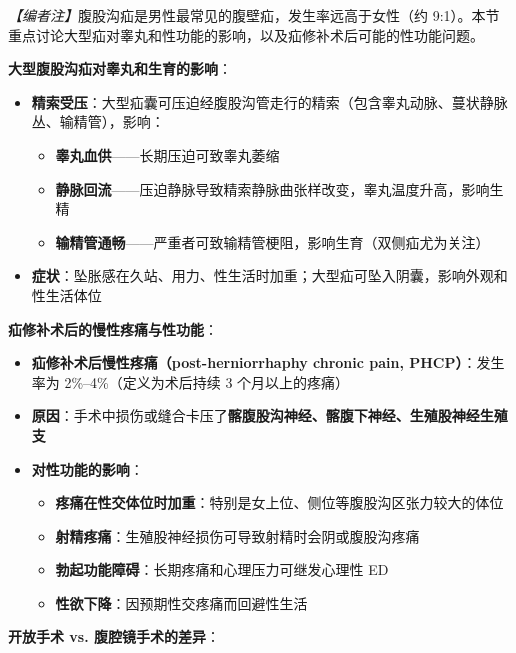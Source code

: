 \documentclass[12pt,a4paper,twoside]{ctexbook}
\begin{document}
\noindent\textit{【编者注】}腹股沟疝是男性最常见的腹壁疝，发生率远高于女性（约 9:1）。本节重点讨论大型疝对睾丸和性功能的影响，以及疝修补术后可能的性功能问题。

\vspace{0.5em}
\noindent\textbf{大型腹股沟疝对睾丸和生育的影响}：

\begin{itemize}[leftmargin=2cm]
	\item \textbf{精索受压}：大型疝囊可压迫经腹股沟管走行的精索（包含睾丸动脉、蔓状静脉丛、输精管），影响：
	\begin{itemize}
		\item \textbf{睾丸血供}——长期压迫可致睾丸萎缩
		\item \textbf{静脉回流}——压迫静脉导致精索静脉曲张样改变，睾丸温度升高，影响生精
		\item \textbf{输精管通畅}——严重者可致输精管梗阻，影响生育（双侧疝尤为关注）
	\end{itemize}
	\item \textbf{症状}：坠胀感在久站、用力、性生活时加重；大型疝可坠入阴囊，影响外观和性生活体位
\end{itemize}

\vspace{0.5em}
\noindent\textbf{疝修补术后的慢性疼痛与性功能}：

\begin{itemize}[leftmargin=2cm]
	\item \textbf{疝修补术后慢性疼痛（post-herniorrhaphy chronic pain, PHCP）}：发生率为 2\%--4\%（定义为术后持续 3 个月以上的疼痛）
	\item \textbf{原因}：手术中损伤或缝合卡压了\textbf{髂腹股沟神经、髂腹下神经、生殖股神经生殖支}
	\item \textbf{对性功能的影响}：
	\begin{itemize}
		\item \textbf{疼痛在性交体位时加重}：特别是女上位、侧位等腹股沟区张力较大的体位
		\item \textbf{射精疼痛}：生殖股神经损伤可导致射精时会阴或腹股沟疼痛
		\item \textbf{勃起功能障碍}：长期疼痛和心理压力可继发心理性 ED
		\item \textbf{性欲下降}：因预期性交疼痛而回避性生活
	\end{itemize}
\end{itemize}

\vspace{0.5em}
\noindent\textbf{开放手术 vs. 腹腔镜手术的差异}：
\end{document}
